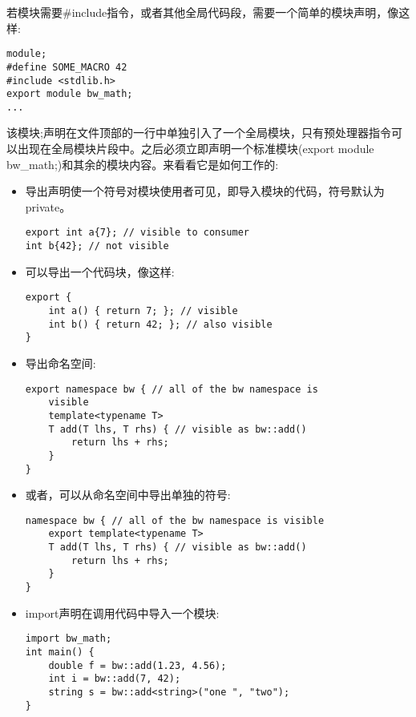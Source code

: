 若模块需要\#include指令，或者其他全局代码段，需要一个简单的模块声明，像这样:

\begin{lstlisting}[style=styleCXX]
module;
#define SOME_MACRO 42
#include <stdlib.h>
export module bw_math;
...
\end{lstlisting}

该模块;声明在文件顶部的一行中单独引入了一个全局模块，只有预处理器指令可以出现在全局模块片段中。之后必须立即声明一个标准模块(export module bw\_math;)和其余的模块内容。来看看它是如何工作的:

\begin{itemize}
\item 
导出声明使一个符号对模块使用者可见，即导入模块的代码，符号默认为private。

\begin{lstlisting}[style=styleCXX]
export int a{7}; // visible to consumer
int b{42}; // not visible
\end{lstlisting}

\item 
可以导出一个代码块，像这样:

\begin{lstlisting}[style=styleCXX]
export {
	int a() { return 7; }; // visible
	int b() { return 42; }; // also visible
}
\end{lstlisting}

\item 
导出命名空间:

\begin{lstlisting}[style=styleCXX]
export namespace bw { // all of the bw namespace is
	visible
	template<typename T>
	T add(T lhs, T rhs) { // visible as bw::add()
		return lhs + rhs;
	}
}
\end{lstlisting}

\item 
或者，可以从命名空间中导出单独的符号:

\begin{lstlisting}[style=styleCXX]
namespace bw { // all of the bw namespace is visible
	export template<typename T>
	T add(T lhs, T rhs) { // visible as bw::add()
		return lhs + rhs;
	}
}
\end{lstlisting}


\item 
import声明在调用代码中导入一个模块:

\begin{lstlisting}[style=styleCXX]
import bw_math;
int main() {
	double f = bw::add(1.23, 4.56);
	int i = bw::add(7, 42);
	string s = bw::add<string>("one ", "two");
}
\end{lstlisting}


\end{itemize}
